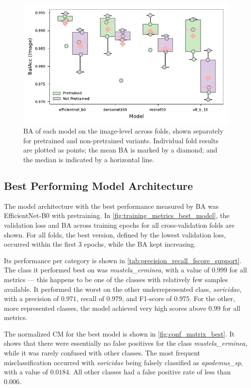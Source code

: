 \begin{figure}[ht]
\centering
\includegraphics{figures/bal_acc_img.pdf}
\caption{\acs{BA} of each model on the image-level across folds, shown separately for pretrained and non-pretrained variants. Individual fold results are plotted as points; the mean \acs{BA} is marked by a diamond; and the median is indicated by a horizontal line.}
\label{fig:bal_acc_img}
\end{figure}

\subsection{Best Performing Model Architecture}
The model architecture with the best performance measured by \ac{BA} was EfficientNet-B0 with pretraining.
In \autoref{fig:training_metrics_best_model}, the validation loss and \ac{BA} across training epochs for all cross-validation folds are shown.
For all folds, the best version, defined by the lowest validation loss, occurred within the first 3 epochs, while the \ac{BA} kept increasing.

Its performance per category is shown in \autoref{tab:precision_recall_fscore_support}.
The class it performed best on was \textit{mustela\_erminea}, with a value of \(0.999\) for all metrics --- this happens to be one of the classes with relatively few samples available.
It performed the worst on the other underrepresented class, \textit{soricidae}, with a precision of \(0.971\), recall of \(0.979\), and F1-score of \(0.975\).
For the other, more represented classes, the model achieved very high scores above \(0.99\) for all metrics.

The normalized \ac{CM} for the best model is shown in \autoref{fig:conf_matrix_best}.
It shows that there were essentially no false positives for the class \textit{mustela\_erminea}, while it was rarely confused with other classes.
The most frequent misclassification occurred with \textit{soricidae} being falsely classified as \textit{apodemus\_sp}, with a value of \(0.0184\).
All other classes had a false positive rate of less than \(0.006\).

